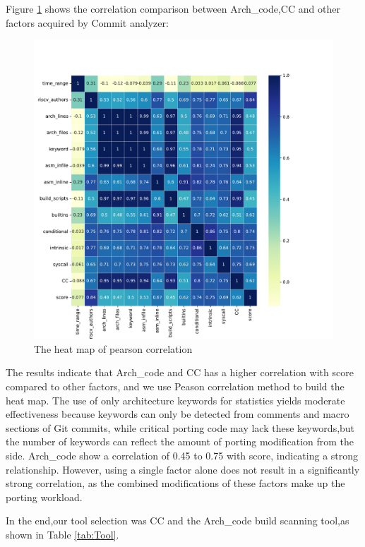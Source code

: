 \documentclass[sigconf,screen,review,anonymous]{acmart}
\begin{document}
Figure \ref{fig:figure3} shows the correlation comparison between Arch\_code,CC and other factors acquired by Commit analyzer:
\begin{figure}
  \centering
  \includegraphics[width=\linewidth]{figure3.pdf}
  \caption{The heat map of pearson correlation}
  \label{fig:figure3}
\end{figure}
The results indicate that Arch\_code and CC has a higher correlation with score compared to other factors, and we use Peason correlation method to build the heat map.
The use of only architecture keywords for statistics yields moderate effectiveness because keywords can only be detected from comments and macro sections of Git commits, while critical porting code may lack these keywords,but the number of keywords can reflect the amount of porting modification from the side.
Arch\_code show a correlation of 0.45 to 0.75 with score, indicating a strong relationship.
However, using a single factor alone does not result in a significantly strong correlation, as the combined modifications of these factors make up the porting workload.

In the end,our tool selection was CC and the Arch\_code build scanning tool,as shown in Table \ref{tab:Tool}.

\end{document}
